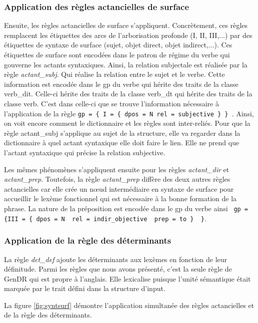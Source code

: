 \subsubsection{Application des règles actancielles de surface}
Ensuite, les règles actancielles de surface s'appliquent. Concrètement, ces règles remplacent les étiquettes des arcs de l'arborisation profonde (I, II, III,...) par des étiquettes de syntaxe de surface (sujet, objet direct, objet indirect,...). Ces étiquettes de surface sont encodées dans le patron de régime du verbe qui gouverne les actants syntaxiques. Ainsi, la relation subjectale est réalisée par la règle \emph{actant\_subj}. Qui réalise la relation entre le sujet et le verbe. Cette information est encodée dans le gp du verbe  qui hérite des traits de la classe verb\_dit. Celle-ci hérite des traits de la classe verb\_dt qui hérite des traits de la classe verb. C'est dans celle-ci que se trouve l'information nécessaire à l'application de la règle \lstinline!gp = { I = { dpos = N rel = subjective } } !. Ainsi, on voit encore comment le dictionnaire et les règles sont inter-reliés. Pour que la règle actant\_subj s'applique au sujet de la structure, elle va regarder dans la dictionnaire à quel actant syntaxique elle doit faire le lien. Elle ne prend que l'actant syntaxique qui précise la relation subjective.

Les mêmes phénomènes s'appliquent ensuite pour les règles \emph{actant\_dir} et \emph{actant\_prep}. Toutefois, la règle \emph{actant\_prep} diffère des deux autres règles actancielles car elle crée un n\oe{}ud intermédiaire en syntaxe de surface pour accueillir le lexème fonctionnel  qui est nécessaire à la bonne formation de la phrase. La nature de la préposition est encodée dans le gp du verbe ainsi \lstinline! gp = {III = { dpos = N  rel = indir_objective  prep = to }  }!.

\subsubsection{Application de la règle des déterminants}

La règle \emph{det\_def} ajoute les déterminants aux lexèmes en fonction de leur définitude. Parmi les règles que nous avons présenté, c'est la seule règle de GenDR qui est propre à l'anglais. Elle lexicalise  puisque l'unité sémantique  était marquée par le trait défini dans la structure d'input.

La figure \ref{fig:syntsurf} démontre l'application simultanée des règles actancielles et de la règle des déterminants.


